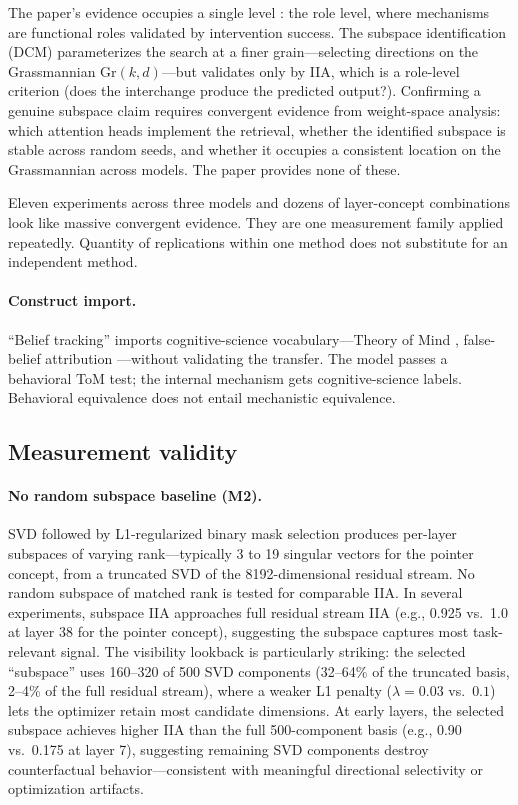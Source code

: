 \documentclass{article}
\begin{document}
The paper's evidence occupies a single level \citep{tower2026mechviews}: the role level, where mechanisms are functional roles validated by intervention success. The subspace identification (DCM) parameterizes the search at a finer grain---selecting directions on the Grassmannian $\text{Gr}(k, d)$---but validates only by IIA, which is a role-level criterion (does the interchange produce the predicted output?). Confirming a genuine subspace claim requires convergent evidence from weight-space analysis: which attention heads implement the retrieval, whether the identified subspace is stable across random seeds, and whether it occupies a consistent location on the Grassmannian across models. The paper provides none of these.

Eleven experiments across three models and dozens of layer-concept combinations look like massive convergent evidence. They are one measurement family applied repeatedly. Quantity of replications within one method does not substitute for an independent method.

\paragraph{Construct import.}
``Belief tracking'' imports cognitive-science vocabulary---Theory of Mind \citep{premack1978chimpanzee}, false-belief attribution \citep{wimmer1983beliefs}---without validating the transfer. The model passes a behavioral ToM test; the internal mechanism gets cognitive-science labels. Behavioral equivalence does not entail mechanistic equivalence.

\subsection{Measurement validity}

\paragraph{No random subspace baseline (M2).}
SVD followed by L1-regularized binary mask selection produces per-layer subspaces of varying rank---typically 3 to 19 singular vectors for the pointer concept, from a truncated SVD of the 8192-dimensional residual stream. No random subspace of matched rank is tested for comparable IIA. In several experiments, subspace IIA approaches full residual stream IIA (e.g., 0.925 vs.\ 1.0 at layer 38 for the pointer concept), suggesting the subspace captures most task-relevant signal. The visibility lookback is particularly striking: the selected ``subspace'' uses 160--320 of 500 SVD components (32--64\% of the truncated basis, 2--4\% of the full residual stream), where a weaker L1 penalty ($\lambda = 0.03$ vs.\ $0.1$) lets the optimizer retain most candidate dimensions. At early layers, the selected subspace achieves higher IIA than the full 500-component basis (e.g., 0.90 vs.\ 0.175 at layer 7), suggesting remaining SVD components destroy counterfactual behavior---consistent with meaningful directional selectivity or optimization artifacts.
\end{document}
